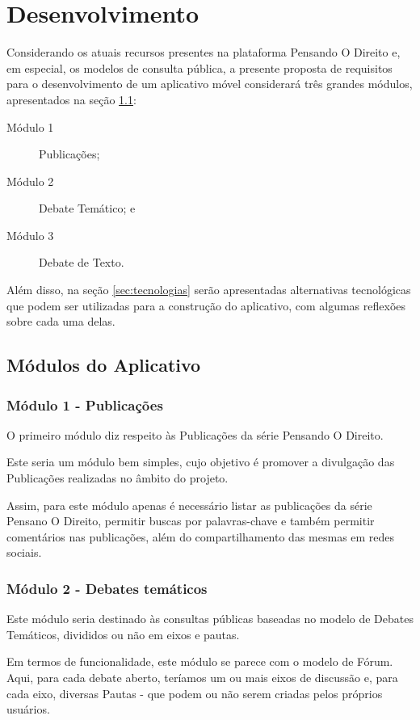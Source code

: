 \chapter{Desenvolvimento}
Considerando os atuais recursos presentes na plataforma Pensando O Direito e, em especial, os modelos de consulta pública, a presente proposta de requisitos para o desenvolvimento de um aplicativo móvel considerará três grandes módulos, apresentados na seção \ref{sec:modulos}:
\begin{description}
\item[Módulo 1]Publicações;
\item[Módulo 2]Debate Temático; e
\item[Módulo 3]Debate de Texto.
\end{description}

Além disso, na seção \ref{sec:tecnologias} serão apresentadas alternativas tecnológicas que podem ser utilizadas para a construção do aplicativo, com algumas reflexões sobre cada uma delas.

\section{Módulos do Aplicativo}\label{sec:modulos}
\subsection{Módulo 1 - Publicações}
O primeiro módulo diz respeito às Publicações da série Pensando O Direito.

Este seria um módulo bem simples, cujo objetivo é promover a divulgação das Publicações realizadas no âmbito do projeto.

Assim, para este módulo apenas é necessário listar as publicações da série Pensano O Direito, permitir buscas por palavras-chave e também permitir comentários nas publicações, além do compartilhamento das mesmas em redes sociais.

\subsection{Módulo 2 - Debates temáticos}
Este módulo seria destinado às consultas públicas baseadas no modelo de Debates Temáticos, divididos ou não em eixos e pautas.

Em termos de funcionalidade, este módulo se parece com o modelo de Fórum. Aqui, para cada debate aberto, teríamos um ou mais eixos de discussão e, para cada eixo, diversas Pautas - que podem ou não serem criadas pelos próprios usuários.


